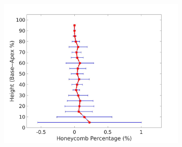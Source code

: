 \begin{figure}[H]
\begin{subfigure}{.4\linewidth}
  \includegraphics[width=\linewidth,trim={{.0\wd0} {.0\wd0} {.0\wd0} {.0\wd0}},clip]{QuantitativeAnalysis/Image/LeftLungHoneycombDiseaseAgainstHeight.jpg} %
  \caption{}
  \label{fig:DiseaseAgainstHeight-e} 
\end{subfigure} 
\begin{subfigure}{.4\linewidth}%

\end{subfigure}
\end{figure}
